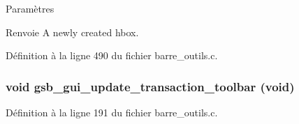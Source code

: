 \begin{DoxyParams}{Paramètres}
\item[{\em }]\end{DoxyParams}
\begin{DoxyReturn}{Renvoie}
A newly created hbox. 
\end{DoxyReturn}


Définition à la ligne 490 du fichier barre\_\-outils.c.

\subsubsection[{gsb\_\-gui\_\-update\_\-transaction\_\-toolbar}]{\setlength{\rightskip}{0pt plus 5cm}void gsb\_\-gui\_\-update\_\-transaction\_\-toolbar (void)}\label{barre__outils_8h_ac0082a1048984a35739d37d106617dd6}


Définition à la ligne 191 du fichier barre\_\-outils.c.

